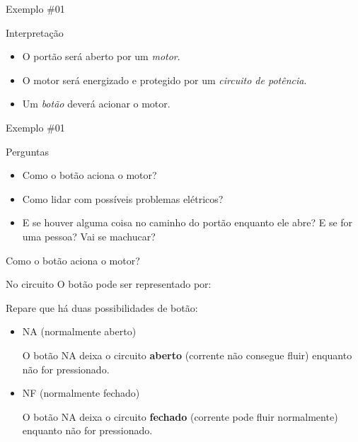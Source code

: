 \begin{frame}{Exemplo \#01}
\begin{block}{Interpretação}
	\begin{itemize}
		\item O portão será aberto por um \textit{motor}.
		\item O motor será energizado e protegido por um \textit{circuito de potência}.
		\item Um \textit{botão} deverá acionar o motor.
	\end{itemize}
\end{block}
\end{frame}

\begin{frame}{Exemplo \#01}
\begin{block}{Perguntas}
	\begin{itemize}
		\item Como o botão aciona o motor?
		\item Como lidar com possíveis problemas elétricos?
		\item E se houver alguma coisa no caminho do portão enquanto ele abre? E se for uma pessoa? Vai se machucar?
	\end{itemize}
\end{block}
\end{frame}

\begin{frame}{Como o botão aciona o motor?}
\begin{block}{No circuito}
O botão pode ser representado por:
\end{block}

\medskip
\begin{center}
\end{center}

\vspace{-1em}

\begin{block}{}
Repare que há duas possibilidades de botão:
\begin{itemize}
	\item NA (normalmente aberto)
	
	O botão NA deixa o circuito \textbf{aberto} (corrente não consegue fluir) enquanto não for pressionado.
	\item NF (normalmente fechado)
	
	O botão NA deixa o circuito \textbf{fechado} (corrente pode fluir normalmente) enquanto não for pressionado.
\end{itemize}
\end{block}
\end{frame}


